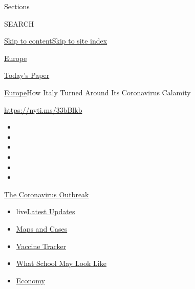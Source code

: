 Sections

SEARCH

\protect\hyperlink{site-content}{Skip to
content}\protect\hyperlink{site-index}{Skip to site index}

\href{https://www.nytimes.com/section/world/europe}{Europe}

\href{https://myaccount.nytimes.com/auth/login?response_type=cookie\&client_id=vi}{}

\href{https://www.nytimes.com/section/todayspaper}{Today's Paper}

\href{/section/world/europe}{Europe}\textbar{}How Italy Turned Around
Its Coronavirus Calamity

\url{https://nyti.ms/33bBlkb}

\begin{itemize}
\item
\item
\item
\item
\item
\item
\end{itemize}

\href{https://www.nytimes.com/news-event/coronavirus?action=click\&pgtype=Article\&state=default\&region=TOP_BANNER\&context=storylines_menu}{The
Coronavirus Outbreak}

\begin{itemize}
\tightlist
\item
  live\href{https://www.nytimes.com/2020/08/01/world/coronavirus-covid-19.html?action=click\&pgtype=Article\&state=default\&region=TOP_BANNER\&context=storylines_menu}{Latest
  Updates}
\item
  \href{https://www.nytimes.com/interactive/2020/us/coronavirus-us-cases.html?action=click\&pgtype=Article\&state=default\&region=TOP_BANNER\&context=storylines_menu}{Maps
  and Cases}
\item
  \href{https://www.nytimes.com/interactive/2020/science/coronavirus-vaccine-tracker.html?action=click\&pgtype=Article\&state=default\&region=TOP_BANNER\&context=storylines_menu}{Vaccine
  Tracker}
\item
  \href{https://www.nytimes.com/interactive/2020/07/29/us/schools-reopening-coronavirus.html?action=click\&pgtype=Article\&state=default\&region=TOP_BANNER\&context=storylines_menu}{What
  School May Look Like}
\item
  \href{https://www.nytimes.com/live/2020/07/31/business/stock-market-today-coronavirus?action=click\&pgtype=Article\&state=default\&region=TOP_BANNER\&context=storylines_menu}{Economy}
\end{itemize}

